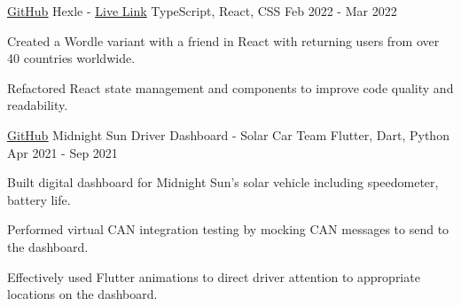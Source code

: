 

\begin{cventries}

  \cventry
    {\href{https://github.com/frankljin/hexle/}{\underline{GitHub}}} %
    {Hexle - \href{https://frankljin.github.io/hexle/}{\underline{Live Link}}} %
    {TypeScript, React, CSS} %
    {Feb 2022 - Mar 2022} %
    {
      \begin{cvitems} %
        \item {Created a Wordle variant with a friend in React with returning users from over 40 countries worldwide.}
        \item {Refactored React state management and components to improve code quality and readability.}
      \end{cvitems}
    }

  \cventry
    {\href{https://github.com/uw-midsun/telemetry_xiv}{\underline{GitHub}}} %
    {Midnight Sun Driver Dashboard - Solar Car Team} %
    {Flutter, Dart, Python} %
    {Apr 2021 - Sep 2021} %
    {
      \begin{cvitems} %
        \item {Built digital dashboard for Midnight Sun's solar vehicle including speedometer, battery life.}
        \item {Performed virtual CAN integration testing by mocking CAN messages to send to the dashboard.}
        \item {Effectively used Flutter animations to direct driver attention to appropriate locations on the dashboard.}
      \end{cvitems}
    }



\end{cventries}
